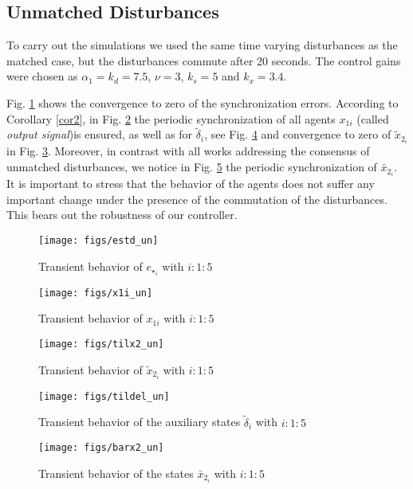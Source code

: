 \documentclass[journal,twoside]{IEEEtran}
\def\x{{x}}
\begin{document}
\subsection*{Unmatched Disturbances}
To carry out the simulations we used the same time varying disturbances as the matched case, but the disturbances commute after 20 seconds. The control gains were chosen as $\alpha_1=k_d=7.5$, $\nu=3$,  $k_s=5$ and $k_x= 3.4$. 

 Fig. \ref{fig7} shows the convergence to zero of the synchronization errors.  According to Corollary \ref{cor2}, in Fig. \ref{fig8} the periodic synchronization of all agents $x_{1i}$ (called {\it output signal})is ensured, as well as for  $\tilde \delta_{i}$, see  Fig. \ref{fig10} and convergence to zero of $\tilde \x_{2_i}$ in Fig. \ref{fig9}. Moreover, in contrast with all works addressing the consensus of unmatched disturbances, we notice in Fig. \ref{fig11} the periodic synchronization of $\bar x_{2_i}$. It is important to stress that the behavior of the agents does not suffer any important change under  the presence of the commutation of the disturbances. This bears out the robustness of our controller.
 
 
 
    \begin{figure}[htp]
 \centering
\texttt{[image: figs/estd\_un]}
\caption{Transient behavior of $e_{\star_i}$ with $i:1:5$}
\label{fig7}
\end{figure}

 
 
   \begin{figure}[htp]
 \centering
\texttt{[image: figs/x1i\_un]}
\caption{Transient behavior of $x_{1i}$ with $i:1:5$}
\label{fig8}
\end{figure}

   \begin{figure}[htp]
 \centering
\texttt{[image: figs/tilx2\_un]}
\caption{Transient behavior of $\tilde x_{2_i}$ with $i:1:5$}
\label{fig9}
\end{figure}
 
 
     \begin{figure}[htp]
 \centering
\texttt{[image: figs/tildel\_un]}
\caption{Transient behavior of the auxiliary states $\tilde \delta_i$  with $i:1:5$}
\label{fig10}
\end{figure}

 
     \begin{figure}[htp]
 \centering
\texttt{[image: figs/barx2\_un]}
\caption{Transient behavior of the states  $\bar x_{2_i}$ with $i:1:5$}
\label{fig11}
\end{figure}
\end{document}
